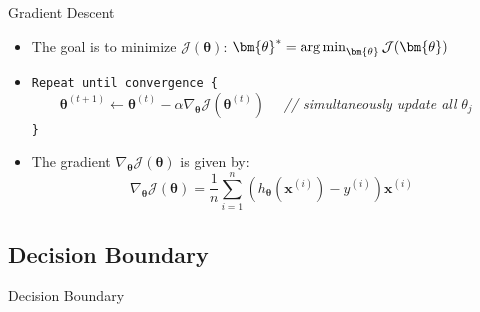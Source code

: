 \begin{frame}{Gradient Descent}{}
	\begin{itemize}
		\item The goal is to minimize $\mathcal{J}(\bm{\theta})$: $\bm{\theta}^*
			= \argmin_{\bm{\theta}} \mathcal{J}(\bm{\theta})$
		\item \texttt{Repeat until convergence \{} \\
			$\qquad \bm{\theta}^{(t+1)} \longleftarrow \bm{\theta}^{(t)} - \alpha \nabla_{\bm{\theta}}
				\mathcal{J}(\bm{\theta}^{(t)}) \quad$
			\textcolor{myblue1}{\textit{// simultaneously update all} $\theta_j$} \\
		\texttt{\}}
		\item The gradient $\nabla_{\bm{\theta}} \mathcal{J}(\bm{\theta})$ is given by:
		{\footnotesize
		\begin{equation}
			\nabla_{\bm{\theta}} \mathcal{J}(\bm{\theta}) = \frac{1}{n} \sum_{i=1}^n \left(
				h_{\bm{\theta}}(\bm{x}^{(i)}) - y^{(i)}
			\right) \bm{x}^{(i)}
		\end{equation}}
	\end{itemize}
	\vspace*{-3mm}
	\begin{boxBlueNoFrame}
	\end{boxBlueNoFrame}
\end{frame}


\subsection{Decision Boundary}

\begin{frame}{Decision Boundary}{}
\end{frame}


